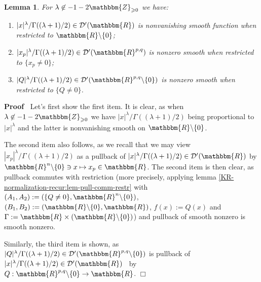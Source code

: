 \documentclass{article}
\newcommand{\assign}{:=}
\newcommand{\nin}{\not\in}
\renewenvironment{proof}{\noindent\textbf{Proof\ }}{\hspace*{\fill}$\Box$\medskip}
\newtheorem{lemma}[proposition]{Lemma}
\theoremstyle{remark}
\begin{document}
\begin{lemma}
  \label{supp-n-waves:lem-supp-xp}For $\lambda \nin - 1 -
  2\mathbbm{Z}_{\geqslant 0}$ we have:
  \begin{enumerate}
    \item $| x |^{\lambda} / \Gamma ((\lambda + 1) / 2) \in \mathcal{D}'
    (\mathbbm{R})$ is nonvanishing smooth function when restricted to
    $\mathbbm{R}\backslash \{ 0 \}$;
    
    \item $| x_p |^{\lambda} / \Gamma ((\lambda + 1) / 2) \in \mathcal{D}'
    (\mathbbm{R}^{p, q})$ is nonzero smooth when restricted to $\{ x_p \neq 0
    \}$;
    
    \item $| Q |^{\lambda} / \Gamma ((\lambda + 1) / 2) \in \mathcal{D}'
    (\mathbbm{R}^{p, q} \backslash \{ 0 \})$ is nonzero smooth when restricted
    to $\{ Q \neq 0 \}$.
  \end{enumerate}
\end{lemma}

\begin{proof}
  Let's first show the first item. It is clear, as when $\lambda \nin - 1 -
  2\mathbbm{Z}_{\geqslant 0}$ we have $| x |^{\lambda} / \Gamma ((\lambda + 1)
  / 2)$ being proportional to $| x |^{\lambda}$ and the latter is nonvanishing
  smooth on $\mathbbm{R}\backslash \{ 0 \}$.
  
  The second item also follows, as we recall that we may view $| x_p
  |^{\lambda} / \Gamma ((\lambda + 1) / 2)$ as a pullback of $| x |^{\lambda}
  / \Gamma ((\lambda + 1) / 2) \in \mathcal{D}' (\mathbbm{R})$ by
  $\mathbbm{R}^n \backslash \{ 0 \} \ni x \mapsto x_p \in \mathbbm{R}$. The
  second item is then clear, as pullback commutes with restriction (more
  precisely, applying lemma \ref{KR-normalization-recur:lem-pull-comm-restr}
  with $(A_1, A_2) \assign (\{ Q \neq 0 \}, \mathbbm{R}^n \backslash \{ 0
  \})$, $(B_1, B_2) \assign (\mathbbm{R}\backslash \{ 0 \}, \mathbbm{R})$, $f
  (x) \assign Q (x)$ and $\Gamma \assign \mathbbm{R} \times
  (\mathbbm{R}\backslash \{ 0 \})$) and pullback of smooth nonzero is smooth
  nonzero.
  
  Similarly, the third item is shown, as $| Q |^{\lambda} / \Gamma ((\lambda +
  1) / 2) \in \mathcal{D}' (\mathbbm{R}^{p, q} \backslash \{ 0 \})$ is
  pullback of $| x |^{\lambda} / \Gamma ((\lambda + 1) / 2) \in \mathcal{D}'
  (\mathbbm{R})$ \ by $Q : \mathbbm{R}^{p, q} \backslash \{ 0 \} \rightarrow
  \mathbbm{R}$.
\end{proof}
\end{document}
